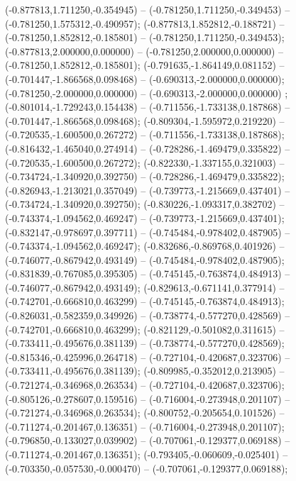  (-0.877813,1.711250,-0.354945) -- (-0.781250,1.711250,-0.349453) -- (-0.781250,1.575312,-0.490957);
 (-0.877813,1.852812,-0.188721) -- (-0.781250,1.852812,-0.185801) -- (-0.781250,1.711250,-0.349453);
 (-0.877813,2.000000,0.000000) -- (-0.781250,2.000000,0.000000) -- (-0.781250,1.852812,-0.185801);
 (-0.791635,-1.864149,0.081152) -- (-0.701447,-1.866568,0.098468) -- (-0.690313,-2.000000,0.000000);
 (-0.781250,-2.000000,0.000000) -- (-0.690313,-2.000000,0.000000) ;
 (-0.801014,-1.729243,0.154438) -- (-0.711556,-1.733138,0.187868) -- (-0.701447,-1.866568,0.098468);
 (-0.809304,-1.595972,0.219220) -- (-0.720535,-1.600500,0.267272) -- (-0.711556,-1.733138,0.187868);
 (-0.816432,-1.465040,0.274914) -- (-0.728286,-1.469479,0.335822) -- (-0.720535,-1.600500,0.267272);
 (-0.822330,-1.337155,0.321003) -- (-0.734724,-1.340920,0.392750) -- (-0.728286,-1.469479,0.335822);
 (-0.826943,-1.213021,0.357049) -- (-0.739773,-1.215669,0.437401) -- (-0.734724,-1.340920,0.392750);
 (-0.830226,-1.093317,0.382702) -- (-0.743374,-1.094562,0.469247) -- (-0.739773,-1.215669,0.437401);
 (-0.832147,-0.978697,0.397711) -- (-0.745484,-0.978402,0.487905) -- (-0.743374,-1.094562,0.469247);
 (-0.832686,-0.869768,0.401926) -- (-0.746077,-0.867942,0.493149) -- (-0.745484,-0.978402,0.487905);
 (-0.831839,-0.767085,0.395305) -- (-0.745145,-0.763874,0.484913) -- (-0.746077,-0.867942,0.493149);
 (-0.829613,-0.671141,0.377914) -- (-0.742701,-0.666810,0.463299) -- (-0.745145,-0.763874,0.484913);
 (-0.826031,-0.582359,0.349926) -- (-0.738774,-0.577270,0.428569) -- (-0.742701,-0.666810,0.463299);
 (-0.821129,-0.501082,0.311615) -- (-0.733411,-0.495676,0.381139) -- (-0.738774,-0.577270,0.428569);
 (-0.815346,-0.425996,0.264718) -- (-0.727104,-0.420687,0.323706) -- (-0.733411,-0.495676,0.381139);
 (-0.809985,-0.352012,0.213905) -- (-0.721274,-0.346968,0.263534) -- (-0.727104,-0.420687,0.323706);
 (-0.805126,-0.278607,0.159516) -- (-0.716004,-0.273948,0.201107) -- (-0.721274,-0.346968,0.263534);
 (-0.800752,-0.205654,0.101526) -- (-0.711274,-0.201467,0.136351) -- (-0.716004,-0.273948,0.201107);
 (-0.796850,-0.133027,0.039902) -- (-0.707061,-0.129377,0.069188) -- (-0.711274,-0.201467,0.136351);
 (-0.793405,-0.060609,-0.025401) -- (-0.703350,-0.057530,-0.000470) -- (-0.707061,-0.129377,0.069188);
